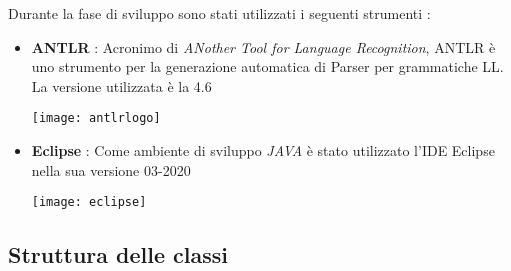 \documentclass{article}
\begin{document}
Durante la fase di sviluppo sono stati utilizzati i seguenti strumenti : \\
\begin{itemize}
    \item \textbf{ANTLR} : Acronimo di \textit{ANother Tool for Language Recognition}, ANTLR è uno strumento per la generazione automatica di Parser per grammatiche LL. La versione utilizzata è la 4.6
    \begin{center}
    \texttt{[image: antlrlogo]}
    \end{center}
    
    \item \textbf{Eclipse} : Come ambiente di sviluppo \textit{JAVA} è stato utilizzato l'IDE Eclipse nella sua versione 03-2020
    \begin{center}
        \texttt{[image: eclipse]}
    \end{center}
\end{itemize}
 \newpage
 \subsection{Struttura delle classi}
 
\end{document}
